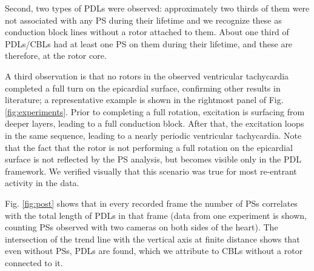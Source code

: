 \documentclass[aps,pre,amsfonts,amssymb,amsmath,twocolumn, superscriptaddress]{revtex4-1}
\begin{document}
Second, two types of PDLs were observed: approximately two thirds of them were not associated with any PS during their lifetime and we recognize these as conduction block lines without a rotor attached to them. About one third of PDLs/CBLs had at least one PS on them during their lifetime, and these are therefore, at the rotor core. 

A third observation is that no rotors in the observed ventricular tachycardia completed a full turn on the epicardial surface, confirming other results in literature; a representative example is shown in the rightmost panel of Fig. \ref{fig:experiments}. Prior to completing a full rotation, excitation is surfacing from deeper layers, leading to a full conduction block. After that, the excitation loops in the same sequence, leading to a nearly periodic ventricular tachycardia. Note that the fact that the rotor is not performing a full rotation on the epicardial surface is not reflected by the PS analysis, but becomes visible only in the PDL framework. We verified visually that this scenario was true for most re-entrant activity in the data. %

Fig. \ref{fig:post} shows that in every recorded frame the number of PSs correlates with the total length of PDLs in that frame (data from one experiment is shown, counting PSs observed with two cameras on both sides of the heart). The intersection of the trend line with the vertical axis at finite distance shows that even without PSs, PDLs are found, which we attribute to CBLs without a rotor connected to it. %
\end{document}
